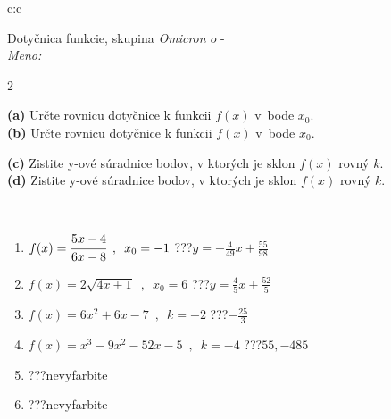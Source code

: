 \documentclass[10pt]{report}
\newcommand\omicron{o}
\begin{document}
\begin{tabular}{c:c}
\begin{minipage}[c][104.5mm][t]{0.5\linewidth}
\begin{center}
\vspace{7mm}
{\huge Dotyčnica funkcie, skupina \textit{Omicron $\omicron$} -}\\[5mm]
\textit{Meno:}\phantom{xxxxxxxxxxxxxxxxxxxxxxxxxxxxxxxxxxxxxxxxxxxxxxxxxxxxxxxxxxxxxxxxx}\\[5mm]
\begin{minipage}{0.95\linewidth}
\begin{center}
{\small \begin{multicols}{2} \raggedright
\textbf{(a)} Určte rovnicu dotyčnice k funkcii \(f(x)\) v~bode \(x_0\). \\[1mm]
\textbf{(b)} Určte rovnicu dotyčnice k funkcii \(f(x)\) v~bode \(x_0\). \par \columnbreak
\textbf{(c)} Zistite y-ové súradnice bodov, v ktorých je sklon \(f(x)\) rovný \(k\). \\[1mm]
\textbf{(d)} Zistite y-ové súradnice bodov, v ktorých je sklon \(f(x)\) rovný \(k\). \\[1mm]
\end{multicols}
}
\end{center}
\end{minipage}
\\[4mm]
\begin{minipage}{0.79\linewidth}
\begin{center}
\begin{varwidth}{\linewidth}
\begin{enumerate}
\normalsizerr
\item $f(x)=\cfrac{5x-4}{6x-8}\enspace , \enspace x_0=-1$\quad \dotfill\; ???\;\dotfill \quad $y = -\frac{4}{49}x+\frac{55}{98}$
\item $f(x)=2\sqrt{4x+1}\enspace , \enspace x_0=6$\quad \dotfill\; ???\;\dotfill \quad $y = \frac{4}{5}x+\frac{52}{5}$
\item $f(x)=6x^2+6x-7\enspace , \enspace k=-2$\quad \dotfill\; ???\;\dotfill \quad $-\frac{25}{3}$
\item $f(x)=x^3-9x^2-52x-5\enspace , \enspace k=-4$\quad \dotfill\; ???\;\dotfill \quad $55 , -485$
\item \quad \dotfill\; ???\;\dotfill \quad nevyfarbite
\item \quad \dotfill\; ???\;\dotfill \quad nevyfarbite
\end{enumerate}
\end{varwidth}

\end{center}
\end{minipage}
\end{center}
\end{minipage}
\end{tabular}
\end{document}
